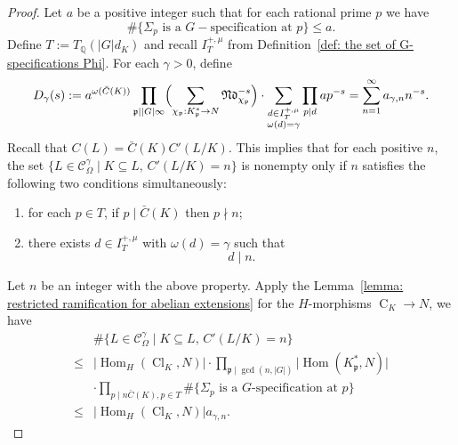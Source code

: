 \documentclass[12pt,a4paper]{amsart}
\numberwithin{equation}{section}%
\theoremstyle{plain}%
\theoremstyle{definition}%
\theoremstyle{remark}%
\begin{document}
    \begin{proof}
    	Let $a$ be a positive integer such that for each rational prime $p$ we have
    	\begin{equation*}
    		\#\{\Sigma_{p}\text{ is a }G-\text{specification at }p\}\leq a.
    	\end{equation*}
    	Define $T:=T_{\mathbb{Q}}(\lvert G\rvert d_{K})$ and recall $I_{T}^{+,\mu}$ from Definition~\ref{def: the set of G-specifications Phi}.
    	For each $\gamma>0$, define
    	\begin{equation*}
    		D_{\gamma}(s):=
    		a^{\omega(\bar{C}(K))}
    		\prod_{\mathfrak{p}\mid\lvert G\rvert\infty}\Bigl(\sum_{\chi_{\mathfrak{p}}:K_{\mathfrak{p}}^{*}\to N}\mathfrak{Nd}_{\chi_{\mathfrak{p}}}^{-s}\Bigr)
    		\cdot\sum_{
    			\substack{
    				d\in I_{T}^{+,\mu}\\
    				\omega(d)=\gamma
    			}
    		}\prod_{p\mid d}ap^{-s}=\sum_{n=1}^{\infty}a_{\gamma,n}n^{-s}.
    	\end{equation*}
    	Recall that $C(L)=\bar{C}(K)C'(L/K)$.
    	This implies that for each positive $n$, the set $\{L\in\mathcal{C}_{\Omega}^{\gamma}\mid K\subseteq L,\, C'(L/K)=n\}$ is nonempty only if $n$ satisfies the following two conditions simultaneously:
    	\begin{enumerate}
    		\item for each $p\in T$, if $p\mid\bar{C}(K)$ then $p\nmid n$;
    		\item there exists $d\in I_{T}^{+,\mu}$ with $\omega(d)=\gamma$ such that
    		\begin{equation*}
    			d\mid n.
    		\end{equation*} 
    	\end{enumerate}
    	Let $n$ be an integer with the above property.
    	Apply the Lemma~\ref{lemma: restricted ramification for abelian extensions} for the $H$-morphisms $\operatorname{C}_{K}\to N$, we have
    	\begin{align*}
    		& \#\{L\in\mathcal{C}_{\Omega}^{\gamma}\mid K\subseteq L,\, C'(L/K)=n\}\\
    		\leq & \lvert\operatorname{Hom}_{H}(\operatorname{Cl}_{K},N)\rvert
    		\cdot\prod_{\mathfrak{p}\mid\gcd(n,\lvert G\rvert)}\lvert\operatorname{Hom}(K_{\mathfrak{p}}^{*},N)\rvert \\
    		&\cdot\prod_{p\mid n\bar{C}(K),p\in T}\#\{\Sigma_{p}\text{ is a }G\text{-specification at }p\}\\
    		\leq & \lvert\operatorname{Hom}_{H}(\operatorname{Cl}_{K},N)\rvert a_{\gamma,n}.

\end{align*}
\end{proof}
\end{document}

